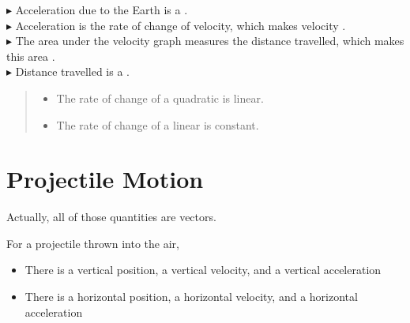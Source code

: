 \documentclass{ximera}
\begin{document}
\begin{summary}
$\blacktriangleright$ Acceleration due to the Earth is a . \\

$\blacktriangleright$ Acceleration is the rate of change of velocity, which makes velocity . \\

$\blacktriangleright$ The area under the velocity graph measures the distance travelled, which makes this area . \\

$\blacktriangleright$ Distance travelled is a . \\




\begin{quote}
\begin{itemize}
\item The rate of change of a quadratic is linear.
\item The rate of change of a linear is constant.
\end{itemize}
\end{quote}



\end{summary}








\section{Projectile Motion}


Actually, all of those quantities are vectors.  

\begin{observation}
For a projectile thrown into the air, 
\begin{itemize}
\item There is a vertical position, a vertical velocity, and a vertical acceleration
\item There is a horizontal position, a horizontal velocity, and a horizontal acceleration
\end{itemize}
\end{observation}
\end{document}
